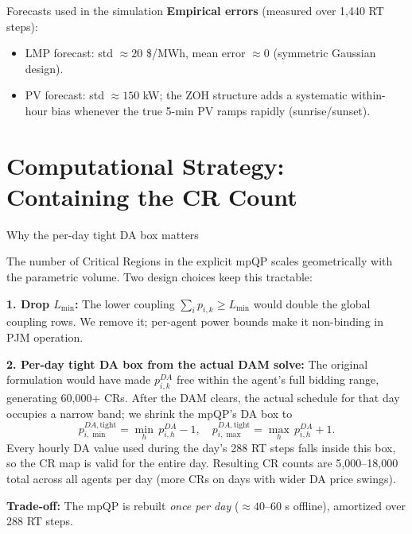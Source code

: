 \documentclass[11pt, letterpaper]{article}
\begin{document}
\begin{answerbox}{Forecasts used in the simulation}
\textbf{Empirical errors} (measured over 1{,}440 RT steps):
\begin{itemize}[nosep]
    \item LMP forecast: std $\approx 20$ \$/MWh, mean error $\approx 0$ (symmetric Gaussian design).
    \item PV forecast: std $\approx 150$ kW; the ZOH structure adds a systematic within-hour bias whenever the true 5-min PV ramps rapidly (sunrise/sunset).
\end{itemize}

\end{answerbox}

\section{Computational Strategy: Containing the CR Count}

\begin{answerbox}{Why the per-day tight DA box matters}

The number of Critical Regions in the explicit mpQP scales geometrically with the parametric volume. Two design choices keep this tractable:

\textbf{1. Drop $L_{\min}$:} The lower coupling $\sum_i p_{i,k} \ge L_{\min}$ would double the global coupling rows. We remove it; per-agent power bounds make it non-binding in PJM operation.

\textbf{2. Per-day tight DA box from the actual DAM solve:}
The original formulation would have made $p^{DA}_{i,k}$ free within the agent's full bidding range, generating 60{,}000+ CRs. After the DAM clears, the actual schedule for that day occupies a narrow band; we shrink the mpQP's DA box to
\[
  p^{DA,\text{tight}}_{i,\min} = \min_h\, p^{DA}_{i,h} - 1, \quad
  p^{DA,\text{tight}}_{i,\max} = \max_h\, p^{DA}_{i,h} + 1.
\]
Every hourly DA value used during the day's 288 RT steps falls inside this box, so the CR map is valid for the entire day. Resulting CR counts are 5{,}000--18{,}000 total across all agents per day (more CRs on days with wider DA price swings).

\textbf{Trade-off:} The mpQP is rebuilt \emph{once per day} ($\approx 40$–$60$ s offline), amortized over 288 RT steps.

\end{answerbox}

\newpage
\end{document}
